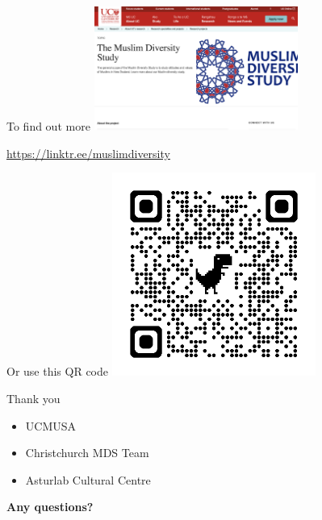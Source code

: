 \documentclass[
  ignorenonframetext,
  aspectratio=169,
]{beamer}
\providecommand{\tightlist}{%
  \setlength{\itemsep}{0pt}\setlength{\parskip}{0pt}}\usepackage{longtable,booktabs,array}
\begin{document}
\begin{frame}{To find out more}
\label{to-find-out-more}
\includegraphics[width=0.5\textwidth,height=\textheight]{figs/mds-uc-banner.png}

\url{https://linktr.ee/muslimdiversity}
\end{frame}

\begin{frame}{Or use this QR code}
\label{or-use-this-qr-code}
\includegraphics[width=0.5\textwidth,height=\textheight]{figs/mds-qr.png}
\end{frame}

\begin{frame}{Thank you}
\label{thank-you}
\begin{itemize}
\tightlist
\item
  UCMUSA
\item
  Christchurch MDS Team
\item
  Asturlab Cultural Centre
\end{itemize}
\end{frame}

\begin{frame}
\textbf{Any questions?}
\end{frame}
\end{document}
